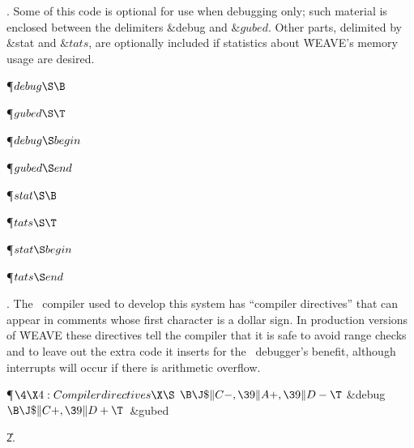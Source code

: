 . Some of this code is optional for use when debugging only;
such material is enclosed between the delimiters  \&{debug}  and $  \&{gubed}
$.
Other parts, delimited by  \&{stat}  and $  \&{tats} $, are optionally included
if statistics about \.{WEAVE}'s memory usage are desired.

\Y\P\D {}$\\{debug}\S\B$\par
\P\D {}$\\{gubed}\S\hbox{}\T$\par
\P\F {}$\\{debug}\S\\{begin}$\par
\P\F {}$\\{gubed}\S\\{end}$\Y\par
\P\D {}$\\{stat}\S\B$\par
\P\D {}$\\{tats}\S\hbox{}\T$\par
\P\F {}$\\{stat}\S\\{begin}$\par
\P\F {}$\\{tats}\S\\{end}$\par
\fi

. The \PASCAL\ compiler used to develop this system has ``compiler
directives'' that can appear in comments whose first character is a dollar
sign.
In production versions of \.{WEAVE} these directives tell the compiler that
it is safe to avoid range checks and to leave out the extra code it inserts
for the \PASCAL\ debugger's benefit, although interrupts will occur if
there is arithmetic overflow.

\Y\P$\4\X4:Compiler directives\X\S$\6
$\B\J\$\|C-,\39\|A+,\39\|D-\T$\6
\&{debug} $\B\J\$\|C+,\39\|D+\T$\ \&{gubed}\par
\U2.\fi


